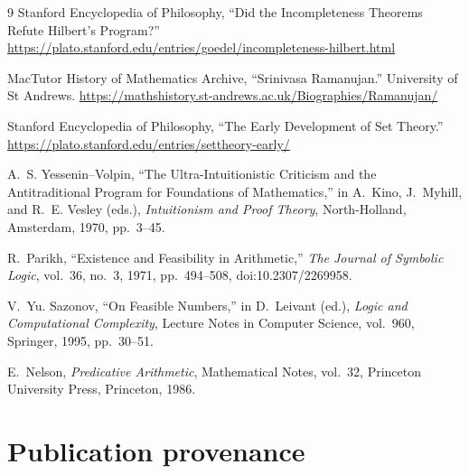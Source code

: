\documentclass[11pt,a4paper]{article}
\begin{document}
\begin{thebibliography}{9}
Stanford Encyclopedia of Philosophy,
``Did the Incompleteness Theorems Refute Hilbert's Program?''
\url{https://plato.stanford.edu/entries/goedel/incompleteness-hilbert.html}

MacTutor History of Mathematics Archive,
``Srinivasa Ramanujan.''
University of St Andrews.
\url{https://mathshistory.st-andrews.ac.uk/Biographies/Ramanujan/}

Stanford Encyclopedia of Philosophy,
``The Early Development of Set Theory.''
\url{https://plato.stanford.edu/entries/settheory-early/}



A.~S. Yessenin--Volpin,
``The Ultra-Intuitionistic Criticism and the Antitraditional Program
for Foundations of Mathematics,''
in A.~Kino, J.~Myhill, and R.~E. Vesley (eds.),
\emph{Intuitionism and Proof Theory},
North-Holland, Amsterdam, 1970, pp.~3--45.

R.~Parikh,
``Existence and Feasibility in Arithmetic,''
\emph{The Journal of Symbolic Logic},
vol.~36, no.~3, 1971, pp.~494--508,
doi:10.2307/2269958.

V.~Yu. Sazonov,
``On Feasible Numbers,''
in D.~Leivant (ed.),
\emph{Logic and Computational Complexity},
Lecture Notes in Computer Science, vol.~960,
Springer, 1995, pp.~30--51.

E.~Nelson,
\emph{Predicative Arithmetic},
Mathematical Notes, vol.~32,
Princeton University Press, Princeton, 1986.

\end{thebibliography}



\section*{Publication provenance}
\end{document}
